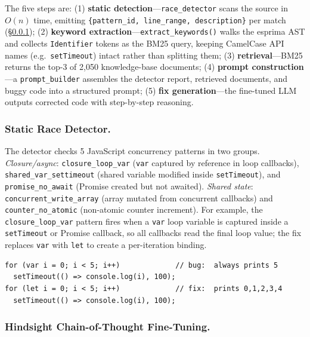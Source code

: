 \documentclass[runningheads]{llncs}
\begin{document}
The five steps are:
(1) \textbf{static detection}---\texttt{race\_detector} scans the source in
$O(n)$ time, emitting \texttt{\{pattern\_id, line\_range, description\}}
per match (\S\ref{sec:design:detector});
(2) \textbf{keyword extraction}---\texttt{extract\_keywords()} walks the
esprima AST and collects \texttt{Identifier} tokens as the BM25 query,
keeping CamelCase API names (e.g.\ \texttt{setTimeout}) intact rather than
splitting them;
(3) \textbf{retrieval}---BM25 returns the top-3 of 2,050 knowledge-base
documents;
(4) \textbf{prompt construction}---a \texttt{prompt\_builder} assembles the
detector report, retrieved documents, and buggy code into a structured
prompt;
(5) \textbf{fix generation}---the fine-tuned LLM outputs corrected code
with step-by-step reasoning.

\subsubsection{Static Race Detector.}
\label{sec:design:detector}

The detector checks 5 JavaScript concurrency patterns in two groups.
\emph{Closure/async}: \texttt{closure\_loop\_var} (\texttt{var} captured by
reference in loop callbacks), \texttt{shared\_var\_settimeout} (shared
variable modified inside \texttt{setTimeout}), and \texttt{promise\_no\_await}
(Promise created but not awaited).
\emph{Shared state}: \texttt{concurrent\_write\_array} (array mutated from
concurrent callbacks) and \texttt{counter\_no\_atomic} (non-atomic counter
increment).
For example, the \texttt{closure\_loop\_var} pattern fires when a
\texttt{var} loop variable is captured inside a \texttt{setTimeout} or
Promise callback, so all callbacks read the final loop value; the fix
replaces \texttt{var} with \texttt{let} to create a per-iteration binding.

\begin{lstlisting}[style=js, caption={\texttt{closure\_loop\_var}: bug (\texttt{var}, prints 5,5,...) vs.\ fix (\texttt{let}, prints 0,1,...).}]
for (var i = 0; i < 5; i++)             // bug:  always prints 5
  setTimeout(() => console.log(i), 100);
for (let i = 0; i < 5; i++)             // fix:  prints 0,1,2,3,4
  setTimeout(() => console.log(i), 100);
\end{lstlisting}

\subsubsection{Hindsight Chain-of-Thought Fine-Tuning.}
\label{sec:design:finetuning}
\end{document}
